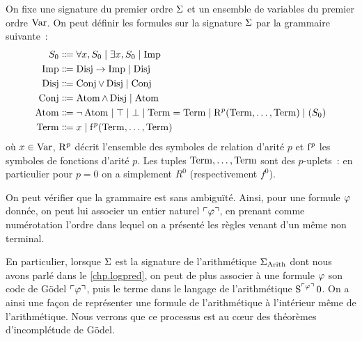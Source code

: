 \begin{example}
  On fixe une signature du premier ordre $\Sigma$ et un ensemble de variables
  du premier ordre $\operatorname{Var}$. On peut définir les formules sur la signature $\Sigma$
  par la grammaire suivante~:
  \begin{align*}
    \StGr &\inddefeq \forall x, \StGr \mid \exists x, \StGr\mid \Imp\\
    \Imp &\inddefeq \Disj \to \Imp \mid \Disj\\
    \Disj &\inddefeq \Conj \lor \Disj \mid \Conj\\
    \Conj &\inddefeq \Atom \land \Disj \mid \Atom\\
    \Atom &\inddefeq \lnot \Atom \mid \top \mid \bot \mid \Term = \Term \mid
    \symbR^p(\Term,\ldots,\Term)\mid (\StGr)\\
    \Term &\inddefeq x \mid \symbF^p(\Term,\ldots,\Term)
  \end{align*}
  où $x \in \operatorname{Var}$, $\mathrm{R}^p$ décrit l'ensemble des symboles de relation
  d'arité $p$ et $\mathrm{f}^p$ les symboles de fonctions d'arité $p$. Les tuples
  $\operatorname{Term},\ldots,\operatorname{Term}$ sont des $p$-uplets~: en particulier pour $p = 0$ on a
  simplement $R^0$ (respectivement $f^0$).
  
  On peut vérifier que la grammaire est sans ambiguïté. Ainsi, pour une formule
  $\varphi$ donnée, on peut lui associer un entier naturel $\ulcorner\varphi\urcorner$, en
  prenant comme numérotation l'ordre dans lequel on a présenté les règles venant
  d'un même non terminal.

  En particulier, lorsque $\Sigma$ est la signature de l'arithmétique
  $\Sigma_{\operatorname{Arith}}$ dont nous avons parlé dans le \cref{chp.logpred}, on peut de
  plus associer à une formule $\varphi$ son code de Gödel $\ulcorner\varphi\urcorner$, puis
  le terme dans le langage de l'arithmétique $\operatorname{S}^{\ulcorner\varphi\urcorner}0$. On a ainsi une
  façon de représenter une formule de l'arithmétique à l'intérieur même de
  l'arithmétique. Nous verrons que ce processus est au c\oe ur des théorèmes
  d'incomplétude de Gödel.
\end{example}

